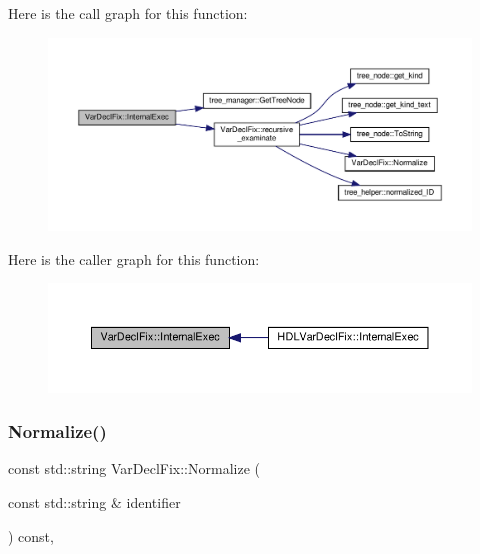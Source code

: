 Here is the call graph for this function\+:
\nopagebreak
\begin{figure}[H]
\begin{center}
\leavevmode
\includegraphics[width=350pt]{db/d32/classVarDeclFix_a41dbca562077d47c2d67bc7b7d2ef41d_cgraph}
\end{center}
\end{figure}
Here is the caller graph for this function\+:
\nopagebreak
\begin{figure}[H]
\begin{center}
\leavevmode
\includegraphics[width=350pt]{db/d32/classVarDeclFix_a41dbca562077d47c2d67bc7b7d2ef41d_icgraph}
\end{center}
\end{figure}
\mbox{\label{classVarDeclFix_a20e7d8b00a37444085e46773a6483d3b}} 
\subsubsection{\texorpdfstring{Normalize()}{Normalize()}}
{\footnotesize\ttfamily const std\+::string Var\+Decl\+Fix\+::\+Normalize (\begin{DoxyParamCaption}\item[{const std\+::string \&}]{identifier }\end{DoxyParamCaption}) const\hspace{0.3cm}{\ttfamily [protected]}, {\ttfamily [virtual]}}




